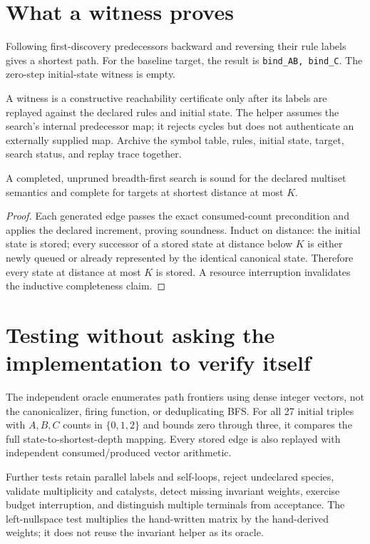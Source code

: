 \section{What a witness proves}
Following first-discovery predecessors backward and reversing their rule labels
gives a shortest path. For the baseline target, the result is
\texttt{bind\_AB, bind\_C}. The zero-step initial-state witness is empty.

A witness is a constructive reachability certificate only after its labels are
replayed against the declared rules and initial state. The helper assumes the
search's internal predecessor map; it rejects cycles but does not authenticate
an externally supplied map. Archive the symbol table, rules, initial state,
target, search status, and replay trace together.

\begin{proposition}
A completed, unpruned breadth-first search is sound for the declared multiset
semantics and complete for targets at shortest distance at most $K$.
\end{proposition}
\begin{proof}
Each generated edge passes the exact consumed-count precondition and applies the
declared increment, proving soundness. Induct on distance: the initial state is
stored; every successor of a stored state at distance below $K$ is either newly
queued or already represented by the identical canonical state. Therefore every
state at distance at most $K$ is stored. A resource interruption invalidates the
inductive completeness claim.
\end{proof}

\section{Testing without asking the implementation to verify itself}
The independent oracle enumerates path frontiers using dense integer vectors,
not the canonicalizer, firing function, or deduplicating BFS. For all 27 initial
triples with $A,B,C$ counts in $\{0,1,2\}$ and bounds zero through three, it compares
the full state-to-shortest-depth mapping. Every stored edge is also replayed with
independent consumed/produced vector arithmetic.

Further tests retain parallel labels and self-loops, reject undeclared species,
validate multiplicity and catalysts, detect missing invariant weights, exercise
budget interruption, and distinguish multiple terminals from acceptance. The
left-nullspace test multiplies the hand-written matrix by the hand-derived
weights; it does not reuse the invariant helper as its oracle.

